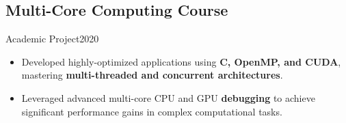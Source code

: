 \subsection{Multi-Core Computing Course}{Academic Project}{2020}
\begin{itemize}
    \item Developed highly-optimized applications using \textbf{C, OpenMP, and CUDA}, mastering \textbf{multi-threaded and concurrent architectures}.
    \item Leveraged advanced multi-core CPU and GPU \textbf{debugging} to achieve significant performance gains in complex computational tasks.
\end{itemize}
